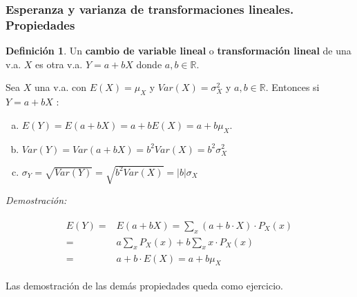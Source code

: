 \documentclass[handout]{beamer}\usepackage[]{graphicx}\usepackage[]{color}
\newcommand{\RR}{\mathbb{R}}
\theoremstyle{plain}
\theoremstyle{definition}
\newtheorem{definicion}{Definición}
\begin{document}
\begin{frame}
\frametitle{Esperanza y varianza de transformaciones lineales. Propiedades}

\begin{definicion}
 Un \textbf{cambio de variable lineal} o \textbf{transformación lineal}
de una v.a. $X$ es otra v.a. $Y= a+ b X$  donde $a,b\in\RR$.
\end{definicion}

Sea $X$ una v.a. con
$E(X)=\mu_{X}$ y $Var(X)=\sigma_{X}^2$ y $a,b\in\RR$. Entonces si $Y=a+b X$ :
\begin{enumerate}[a)]
    \item $E(Y)=E(a + b X)=a+ b E(X)= a + b \mu_{X}$.
    \item $Var(Y)=Var(a+bX)=b^2 Var(X)= b^2 \sigma_{X}^2$
    \item $\sigma_{Y}=\sqrt{Var(Y)}=\sqrt{b^2 Var(X)}=|b| \sigma_{X}$
\end{enumerate}
\end{frame}

\begin{frame}
    
\textit{Demostración:}

\begin{align*}
\begin{split}
E(Y)=& E(a+bX)=\sum_{x}(a+b\cdot X)\cdot P_{X}(x)\\ =& 
a \sum_{x} P_{X}(x) + b \sum_{x} x\cdot P_{X}(x)\\ 
=& a + b\cdot E(X)=a + b \mu_{X}
\end{split}
\end{align*}

Las demostración de las demás propiedades queda como ejercicio.

\end{frame}
\end{document}
